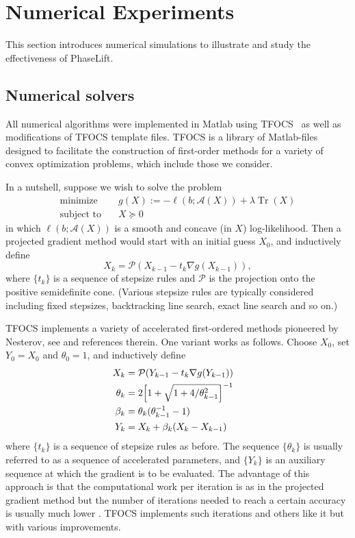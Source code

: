 \documentclass[11pt]{article}
\newcommand{\<}{\langle}
\renewcommand{\>}{\rangle}
\newcommand{\cA}{\mathcal{A}}
\newcommand{\trace}{\operatorname{Tr}}
\numberwithin{equation}{section}
\begin{document}
\section{Numerical Experiments}
\label{sec:numerics}


This section introduces numerical simulations to illustrate and study
the effectiveness of PhaseLift. %

\subsection{Numerical solvers}
 
All numerical algorithms were implemented in Matlab using
TFOCS~\cite{BCG10} as well as modifications of TFOCS template
files. TFOCS is a library of Matlab-files designed to facilitate the
construction of first-order methods for a variety of convex
optimization problems, which include those we consider. 

In a nutshell, suppose we wish to solve the problem
\begin{equation}
\label{eq:composite}
 \begin{array}{ll}
   \text{minimize}   & \quad g(X) :=  -\ell(b; \cA(X)) + \lambda \trace(X) \\
   \text{subject to}    & \quad X \succeq 0 
\end{array}
\end{equation}
in which $\ell(b; \cA(X))$ is a smooth and concave (in $X$)
log-likelihood. Then a projected gradient method would start with an
initial guess $X_0$, and inductively define 
\[
X_k = \mathcal{P}(X_{k-1} - t_k \nabla g(X_{k-1})),  
\]
where $\{t_k\}$ is a sequence of stepsize rules and $\mathcal{P}$ is
the projection onto the positive semidefinite cone.  (Various stepsize
rules are typically considered including fixed stepsizes, backtracking
line search, exact line search and so on.)

TFOCS implements a variety of accelerated first-ordered methods
pioneered by Nesterov, see \cite{NesterovBook} and references therein.
One variant \cite{FISTA} works as follows. Choose $X_0$, set $Y_0 =
X_0$ and $\theta_0 = 1$, and inductively define
\begin{align*}
  X_k & = \mathcal{P}(Y_{k-1} - t_k \nabla g(Y_{k-1})) \cr
  \theta_k & = 2\Bigl[1 + \sqrt{1 + 4/\theta_{k-1}^2}\Bigr]^{-1} \cr
  \beta_k  & = \theta_k(\theta_{k-1}^{-1} - 1) \cr
  Y_k  & = X_k + \beta_k (X_k - X_{k-1})
\end{align*}
where $\{t_k\}$ is a sequence of stepsize rules as before. The
sequence $\{\theta_k\}$ is usually referred to as a sequence of
accelerated parameters, and $\{Y_k\}$ is an auxiliary sequence at
which the gradient is to be evaluated.  The advantage of this approach
is that the computational work per iteration is as in the projected
gradient method but the number of iterations needed to reach a certain
accuracy is usually much lower \cite{NesterovBook}. TFOCS implements
such iterations and others like it but with various improvements.
\end{document}
